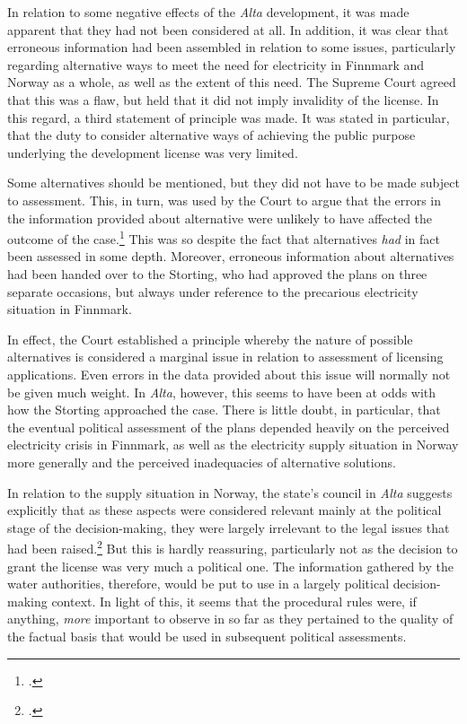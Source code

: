 In relation to some negative effects of the {\it Alta} development, it was made apparent that they had not been considered at all. In addition, it was clear that erroneous information had been assembled in relation to some issues, particularly regarding alternative ways to meet the need for electricity in Finnmark and Norway as a whole, as well as the extent of this need. The Supreme Court agreed that this was a flaw, but held that it did not imply invalidity of the license. In this regard, a third statement of principle was made. It was stated in particular,  that the duty to consider alternative ways of achieving the public purpose underlying the development license was very limited. 

Some alternatives should be mentioned, but they did not have to be made subject to assessment. This, in turn, was used by the Court to argue that the errors in the information provided about alternative were unlikely to have affected the outcome of the case.\footcite[346]{alta82} This was so despite the fact that alternatives {\it had} in fact been assessed in some depth. Moreover, erroneous information about alternatives had been handed over to the Storting, who had approved the plans on three separate occasions, but always under reference to the precarious electricity situation in Finnmark.

In effect, the Court established a principle whereby the nature of possible alternatives is considered a marginal issue in relation to assessment of licensing applications. Even errors in the data provided about this issue will normally not be given much weight. In {\it Alta}, however, this seems to have been at odds with how the Storting approached the case. There is little doubt, in particular, that the eventual political assessment of the plans depended heavily on the perceived electricity crisis in Finnmark, as well as the electricity supply situation in Norway more generally and the perceived inadequacies of alternative solutions.

In relation to the supply situation in Norway, the state's council in {\it Alta} suggests explicitly that as these aspects were considered relevant mainly at the political stage of the decision-making, they were largely irrelevant to the legal issues that had been raised.\footcite[341]{alta82} But this is hardly reassuring, particularly not as the decision to grant the license was very much a political one. The information gathered by the water authorities, therefore, would be put to use in a largely political decision-making context. In light of this, it seems that the procedural rules were, if anything, {\it more} important to observe in so far as they pertained to the quality of the factual basis that would be used in subsequent political assessments.

